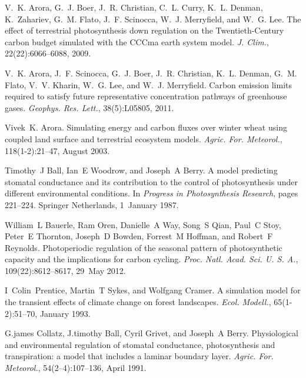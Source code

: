 \begin{DoxyDescription}
\item[\label{_CITEREF_Arora2009-9bc}%
\mbox{[}9\mbox{]}]V.~K. Arora, G.~J. Boer, J.~R. Christian, C.~L. Curry, K.~L. Denman, K.~Zahariev, G.~M. Flato, J.~F. Scinocca, W.~J. Merryfield, and W.~G. Lee. The effect of terrestrial photosynthesis down regulation on the Twentieth-\/\+Century carbon budget simulated with the C\+C\+Cma earth system model. {\itshape J. Clim.}, 22(22)\+:6066--6088, 2009. 


\item[\label{_CITEREF_Arora2011-79f}%
\mbox{[}10\mbox{]}]V.~K. Arora, J.~F. Scinocca, G.~J. Boer, J.~R. Christian, K.~L. Denman, G.~M. Flato, V.~V. Kharin, W.~G. Lee, and W.~J. Merryfield. Carbon emission limits required to satisfy future representative concentration pathways of greenhouse gases. {\itshape Geophys. Res. Lett.}, 38(5)\+:L05805, 2011. 


\item[\label{_CITEREF_Arora2003-3b7}%
\mbox{[}11\mbox{]}]Vivek~K. Arora. Simulating energy and carbon fluxes over winter wheat using coupled land surface and terrestrial ecosystem models. {\itshape Agric. For. Meteorol.}, 118(1-\/2)\+:21--47, August 2003. 


\item[\label{_CITEREF_Ball1987-ou}%
\mbox{[}12\mbox{]}]Timothy~J Ball, Ian~E Woodrow, and Joseph~A Berry. A model predicting stomatal conductance and its contribution to the control of photosynthesis under different environmental conditions. In {\itshape Progress in Photosynthesis Research}, pages 221--224. Springer Netherlands, 1~January 1987. 


\item[\label{_CITEREF_Bauerle2012-c29}%
\mbox{[}13\mbox{]}]William~L Bauerle, Ram Oren, Danielle~A Way, Song~S Qian, Paul~C Stoy, Peter~E Thornton, Joseph~D Bowden, Forrest~M Hoffman, and Robert~F Reynolds. Photoperiodic regulation of the seasonal pattern of photosynthetic capacity and the implications for carbon cycling. {\itshape Proc. Natl. Acad. Sci. U. S. A.}, 109(22)\+:8612--8617, 29~May 2012. 


\item[\label{_CITEREF_Prentice1993-xn}%
\mbox{[}14\mbox{]}]I~Colin~Prentice, Martin~T Sykes, and Wolfgang Cramer. A simulation model for the transient effects of climate change on forest landscapes. {\itshape Ecol. Modell.}, 65(1-\/2)\+:51--70, January 1993. 


\item[\label{_CITEREF_Collatz1991-5bc}%
\mbox{[}15\mbox{]}]G.\+james Collatz, J.\+timothy Ball, Cyril Grivet, and Joseph~A Berry. Physiological and environmental regulation of stomatal conductance, photosynthesis and transpiration\+: a model that includes a laminar boundary layer. {\itshape Agric. For. Meteorol.}, 54(2–4)\+:107--136, April 1991. 



\end{DoxyDescription}
